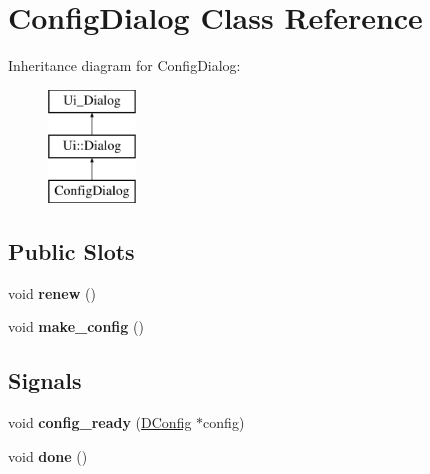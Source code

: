 \hypertarget{class_config_dialog}{
\section{ConfigDialog Class Reference}
\label{class_config_dialog}
}
Inheritance diagram for ConfigDialog:\begin{figure}[H]
\begin{center}
\leavevmode
\includegraphics[height=3.000000cm]{class_config_dialog}
\end{center}
\end{figure}
\subsection*{Public Slots}
\begin{DoxyCompactItemize}
\item 
\hypertarget{class_config_dialog_ae2685db390eb8819ef04427010be9404}{
void {\bfseries renew} ()}
\label{class_config_dialog_ae2685db390eb8819ef04427010be9404}

\item 
\hypertarget{class_config_dialog_afacd2c7d5a0eb160c17f106008275054}{
void {\bfseries make\_\-config} ()}
\label{class_config_dialog_afacd2c7d5a0eb160c17f106008275054}

\end{DoxyCompactItemize}
\subsection*{Signals}
\begin{DoxyCompactItemize}
\item 
\hypertarget{class_config_dialog_ad515d4295b98da3b79bb604c71209dc7}{
void {\bfseries config\_\-ready} (\hyperlink{class_d_config}{DConfig} $\ast$config)}
\label{class_config_dialog_ad515d4295b98da3b79bb604c71209dc7}

\item 
\hypertarget{class_config_dialog_a228b0c52d645a86f9351a2df53f58279}{
void {\bfseries done} ()}
\label{class_config_dialog_a228b0c52d645a86f9351a2df53f58279}

\end{DoxyCompactItemize}
